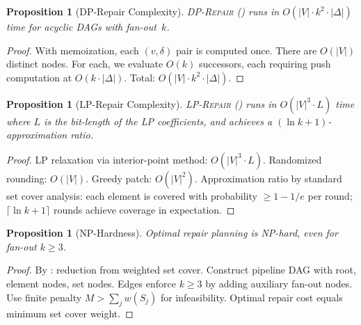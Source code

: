 \documentclass[11pt,a4paper]{article}
\newtheorem{proposition}[theorem]{Proposition}
\theoremstyle{definition}
\begin{document}
\begin{proposition}[DP-Repair Complexity]\label{prop:dp-complexity}
\textsc{DP-Repair} () runs in
$O(|V| \cdot k^2 \cdot |\Delta|)$ time for acyclic DAGs with fan-out~$k$.
\end{proposition}
\begin{proof}
With memoization, each $(v, \delta)$ pair is computed once.  There are $O(|V|)$
distinct nodes.  For each, we evaluate $O(k)$ successors, each requiring
push computation at $O(k \cdot |\Delta|)$.  Total: $O(|V| \cdot k^2 \cdot |\Delta|)$.
\end{proof}

\begin{proposition}[LP-Repair Complexity]\label{prop:lp-complexity}
\textsc{LP-Repair} () runs in
$O(|V|^3 \cdot L)$ time where $L$ is the bit-length of the LP coefficients,
and achieves a $(\ln k + 1)$-approximation ratio.
\end{proposition}
\begin{proof}
LP relaxation via interior-point method: $O(|V|^3 \cdot L)$.
Randomized rounding: $O(|V|)$.  Greedy patch: $O(|V|^2)$.
Approximation ratio by standard set cover analysis: each element is covered
with probability $\geq 1 - 1/e$ per round; $\lceil \ln k + 1 \rceil$ rounds
achieve coverage in expectation.
\end{proof}

\begin{proposition}[NP-Hardness]\label{prop:np-hard}
Optimal repair planning is NP-hard, even for fan-out $k \geq 3$.
\end{proposition}
\begin{proof}
By : reduction from weighted set cover.
Construct pipeline DAG with root, element nodes, set nodes.
Edges enforce $k \geq 3$ by adding auxiliary fan-out nodes.
Use finite penalty $M > \sum_j w(S_j)$ for infeasibility.
Optimal repair cost equals minimum set cover weight.
\end{proof}
\end{document}
